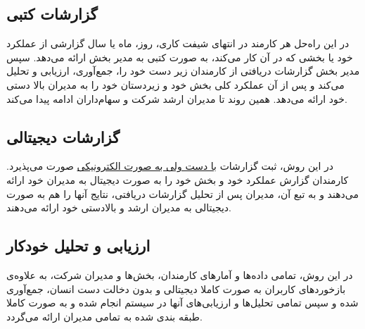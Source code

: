 \documentclass[12pt]{article}
\begin{document}
\subsection{گزارشات کتبی }\label{written-report}
در این راه‌حل هر کارمند در انتهای شیفت کاری، روز، ماه یا سال گزارشی از عملکرد خود یا بخشی که در آن کار می‌کند، به صورت کتبی به مدیر بخش ارائه می‌دهد. سپس مدیر بخش گزارشات دریافتی از کارمندان زیر دست خود را، جمع‌آوری، ارزیابی و تحلیل می‌کند و پس از آن عملکرد کلی بخش خود و زیردستان خود را به مدیران بالا دستی خود ارائه می‌دهد.
همین روند تا مدیران ارشد شرکت و سهام‌داران ادامه پیدا می‌کند.
\subsection{گزارشات دیجیتالی }\label{half-digital}
در این روش، ثبت گزارشات \underline{با دست ولی به صورت الکترونیکی} صورت می‌پذیرد.
کارمندان گزارش عملکرد خود و بخش خود را به صورت دیجیتال به مدیران خود ارائه می‌دهند و به تبع آن، مدیران پس از تحلیل گزارشات دریافتی، نتایج آنها را هم به صورت دیجیتالی به مدیران ارشد و بالادستی خود ارائه می‌دهند.
\subsection{ارزیابی و تحلیل خودکار }\label{full-digital}
در این روش، تمامی داده‌ها و آمار‌های کارمندان، بخش‌ها و مدیران شرکت، به علاوه‌ی بازخورد‌های کاربران به صورت کاملا دیجیتالی و بدون دخالت دست انسان، جمع‌آوری شده و سپس تمامی تحلیل‌ها و ارزیابی‌های آنها در سیستم  انجام شده و به صورت کاملا طبقه بندی شده به تمامی مدیران ارائه می‌گردد.
\end{document}
